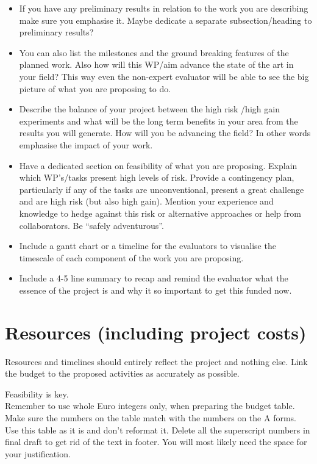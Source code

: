 \documentclass[oneside, a4paper, onecolumn, 11pt]{article}
\begin{document}
\begin{itemize}
\item If you have any preliminary results in relation to the work you are describing make sure you emphasise it. Maybe dedicate a separate subsection/heading to preliminary results?
\item You can also list the milestones and the ground breaking features of the planned work. Also how will this WP/aim advance the state of the art in your field? This way even the non-expert evaluator will be able to see the big picture of what you are proposing to do.
\item Describe the balance of your project between the high risk /high gain experiments and what will be the long term benefits in your area from the results you will generate. How will you be advancing the field? In other words emphasise the impact of your work.
\item Have a dedicated section on feasibility of what you are proposing. Explain which WP’s/tasks present high levels of risk. Provide a contingency plan, particularly if any of the tasks are unconventional, present a great challenge and are high risk (but also high gain). Mention your experience and knowledge to hedge against this risk or alternative approaches or help from collaborators. Be “safely adventurous”.
\item Include a gantt chart or a timeline for the evaluators to visualise the timescale of each component of the work you are proposing.
\item Include a 4-5 line summary to recap and remind the evaluator what the essence of the project is and why it so important to get this funded now.
\end{itemize}


\newpage
\section{Resources (including project costs)}
Resources and timelines should entirely reflect the project and nothing else. Link the budget to the proposed activities as accurately as possible.

Feasibility is key.\\
Remember to use whole Euro integers only, when preparing the budget table.
Make sure the numbers on the table match with the numbers on the A forms.
Use this table as it is and don’t reformat it.
Delete all the superscript numbers in final draft to get rid of the text in footer. You will most likely
need the space for your justification.




\end{document}
